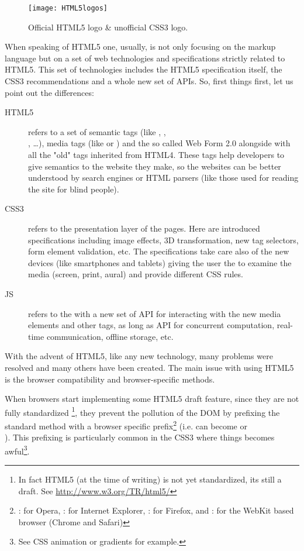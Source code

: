 \begin{figure}[htb]
    \centering
    \texttt{[image: HTML5logos]}
    \caption{Official HTML5 logo \& unofficial CSS3 logo.}
    \label{fig:html-logos}
\end{figure}

When speaking of \ac{HTML}5 one, usually, is not only focusing on the markup language
but on a set of web technologies and specifications strictly related to \ac{HTML}5.
This set of technologies includes the \ac{HTML}5 specification itself, the
\ac{CSS}3 recommendations and a whole new set of \js{} APIs. So, first things
first, let us point out the differences:
\begin{description}
	\item[HTML5] refers to a set of semantic tags (like ,
	,\\, \ldots), media tags (like  or
	) and the so called Web Form 2.0 alongside with all the "old"
	tags inherited from HTML4. These tags help developers to give semantics to
	the website they make, so the websites can be
	better understood by search engines or HTML parsers (like those used for
	reading the site for blind people).

	\item[CSS3] refers to the presentation layer of the pages. Here are introduced
	specifications including image effects, 3D transformation, new tag selectors, 
	form element validation, etc. The specifications take care also of the new
	devices (like smartphones and tablets) giving the user the  to examine the media (screen, print, aural) and provide different
	\ac{CSS} rules.
	
	\item[JS] refers to the \js{} with a new set of API for interacting with the
	new media elements and other tags, as long as API for concurrent computation,
	real-time communication, offline storage, etc.\\
\end{description}

With the advent of \ac{HTML}5, like any new technology, many problems were
resolved and many others have been created. The main issue with using \ac{HTML}5
is the browser compatibility and browser-specific methods.

When browsers start
implementing some \ac{HTML}5 draft feature, since they are not fully standardized
\footnote{In fact HTML5 (at the time of writing) is not yet standardized, its
still a draft. See \url{http://www.w3.org/TR/html5/}}, they prevent the pollution
of the DOM by prefixing the standard method
with a browser specific prefix\footnote{: for
Opera, : for Internet Explorer, : for Firefox, and
: for the WebKit based browser (Chrome and Safari)}
(i.e.  can become  or\\
). This prefixing
is particularly common in the \ac{CSS}3 where things becomes awful\footnote{See
CSS animation or gradients for example.}.\\


